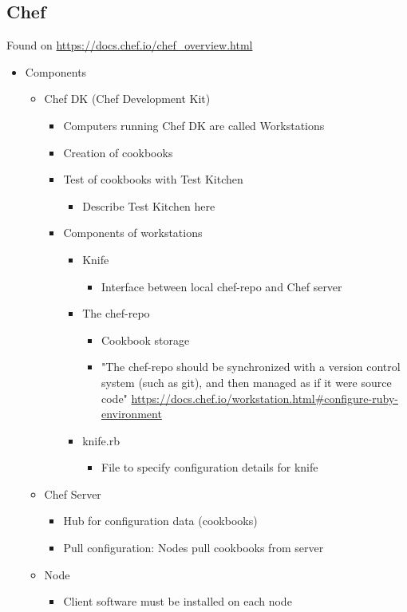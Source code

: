 \subsection{Chef}
	Found on \url{https://docs.chef.io/chef_overview.html}
	\begin{itemize}
		\item Components
			\begin{itemize}
				\item Chef DK (Chef Development Kit)
					\begin{itemize}
						\item Computers running Chef DK are called Workstations
						\item Creation of cookbooks
						\item Test of cookbooks with Test Kitchen
							\begin{itemize}
								\item Describe Test Kitchen here
							\end{itemize}
						\item Components of workstations
							\begin{itemize}
								\item Knife
									\begin{itemize}
										\item Interface between local chef-repo and Chef server
									\end{itemize}
								\item The chef-repo
									\begin{itemize}
										\item Cookbook storage
										\item "The chef-repo should be synchronized with a version control system (such as git), and then managed as if it were source code" \url{https://docs.chef.io/workstation.html#configure-ruby-environment}
									\end{itemize}
								\item knife.rb
									\begin{itemize}
										\item File to specify configuration details for knife
									\end{itemize}
							\end{itemize}
					\end{itemize}
				\item Chef Server
					\begin{itemize}
						\item Hub for configuration data (cookbooks)
						\item Pull configuration: Nodes pull cookbooks from server
					\end{itemize}
				\item Node
					\begin{itemize}
						\item Client software must be installed on each node
						

\end{itemize}
\end{itemize}
\end{itemize}
